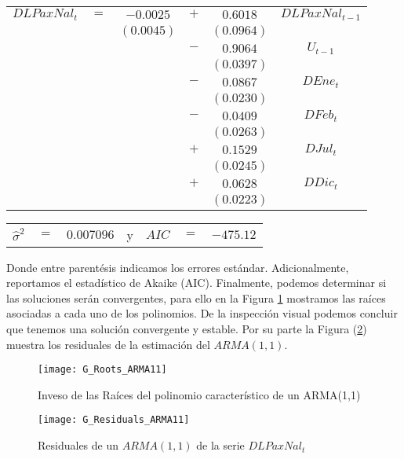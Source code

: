 \documentclass[
  a4paper,
]{article}
\begin{document}
\begin{center}
\begin{tabular}{ c c c c c c } 
    $DLPaxNal_t$ & $=$ & $-0.0025$ & $+$ & $0.6018$  & $DLPaxNal_{t-1}$ \\ 
    &  & $(0.0045)$ &  & $(0.0964)$ & \\
    &  &  & $-$ & $0.9064$ & $U_{t-1}$ \\
    &  &  &  & $(0.0397)$ & \\
    &  &  & $-$ & $0.0867$ & $DEne_t$ \\
    &  &  &  & $(0.0230)$ & \\
    &  &  & $-$ & $0.0409$ & $DFeb_t$ \\
    &  &  &  & $(0.0263)$ & \\
    &  &  & $+$ & $0.1529$ & $DJul_t$ \\
    &  &  &  & $(0.0245)$ & \\
    &  &  & $+$ & $0.0628$ & $DDic_t$ \\
    &  &  &  & $(0.0223)$ &
\end{tabular}
\end{center}

\begin{center}
\begin{tabular}{ c c c c c c c } 
    $\hat{\sigma}^2$ & $=$ & $0.007096$ & y & $AIC$ & $=$ & $-475.12$ 
\end{tabular}
\end{center}

Donde entre parentésis indicamos los errores estándar. Adicionalmente,
reportamos el estadístico de Akaike (AIC). Finalmente, podemos
determinar si las soluciones serán convergentes, para ello en la Figura
\ref{G_Roots_ARMA11} mostramos las raíces asociadas a cada uno de los
polinomios. De la inspección visual podemos concluir que tenemos una
solución convergente y estable. Por su parte la Figura
(\ref{G_Residuals_ARMA11}) muestra los residuales de la estimación del
\(ARMA(1, 1)\).

\begin{figure}
  \centering
    \texttt{[image: G\_Roots\_ARMA11]}
  \caption{Inveso de las Raíces del polinomio característico de un ARMA(1,1)}
  \label{G_Roots_ARMA11}
\end{figure}

\begin{figure}
\centering
    \texttt{[image: G\_Residuals\_ARMA11]}
    \caption{Residuales de un $ARMA(1, 1)$ de la serie $DLPaxNal_t$}
    \label{G_Residuals_ARMA11}
\end{figure}
\end{document}
